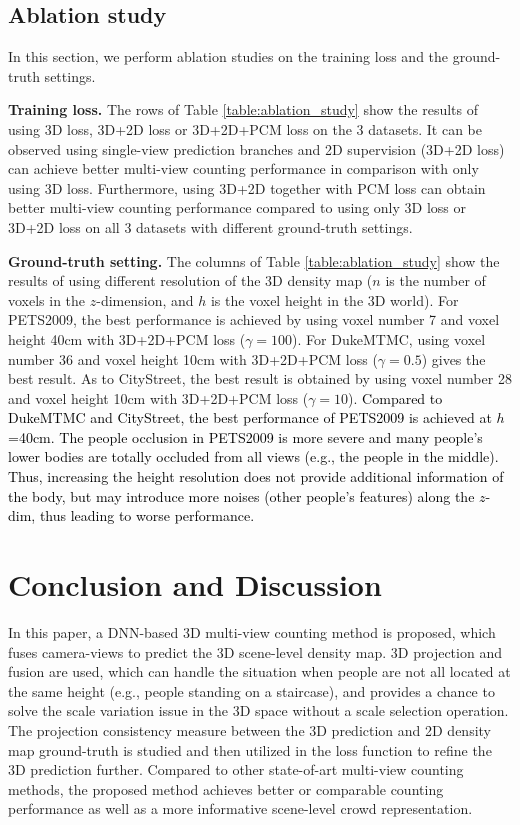 \documentclass[letterpaper]{article}
\newcommand{\zq}[1]{\textcolor{black}{#1}} %
\begin{document}
\subsection{Ablation study}

In this section, we perform ablation studies on the training loss and the ground-truth settings.

\textbf{Training loss.}
The rows of Table \ref{table:ablation_study} show the results of using 3D loss, 3D+2D loss or 3D+2D+PCM loss on the 3 datasets. It can be observed using single-view prediction branches and 2D supervision (3D+2D loss) can achieve better multi-view counting performance in comparison with only using 3D loss.
Furthermore, using 3D+2D together with PCM loss can obtain better multi-view counting performance compared to using only 3D loss or 3D+2D loss on all 3 datasets with different ground-truth settings.


\textbf{Ground-truth setting.}
The columns of Table \ref{table:ablation_study} show the results of using different resolution of the 3D density map ($n$ is the number of voxels in the $z$-dimension, and $h$ is the voxel height in the 3D world).
For PETS2009, the best performance is achieved by using voxel number 7 and voxel height 40cm with 3D+2D+PCM loss ($\gamma=100$). For DukeMTMC, using voxel number 36 and voxel height 10cm with 3D+2D+PCM loss ($\gamma=0.5$) gives the best result. As to CityStreet, the best result is obtained by using voxel number 28 and voxel height 10cm with 3D+2D+PCM loss ($\gamma=10$). \zq{Compared to DukeMTMC and CityStreet, the best performance of PETS2009 is achieved at $h$=40cm. The people occlusion in PETS2009 is more severe and many people's lower bodies are totally occluded from all views (e.g., the people in the middle).
Thus, increasing the height resolution does not provide additional information of the body, but may introduce more noises (other people's features) along the $z$-dim, thus leading to worse performance.}

\section{Conclusion and Discussion}
\par In this paper, a DNN-based 3D multi-view counting method is proposed, which fuses camera-views to predict the 3D scene-level density map. 3D projection and fusion are used, which can handle the situation when people are not all located at the same height (e.g., %
people standing on a staircase),
and provides a chance to solve the scale variation issue in the 3D space without a scale selection operation. The projection consistency measure between the 3D prediction and 2D density map ground-truth is studied and then utilized in the loss function to refine the 3D prediction further.
Compared to other state-of-art multi-view counting methods, the proposed method  achieves better or comparable counting performance as well as a more informative scene-level crowd representation.
\end{document}
